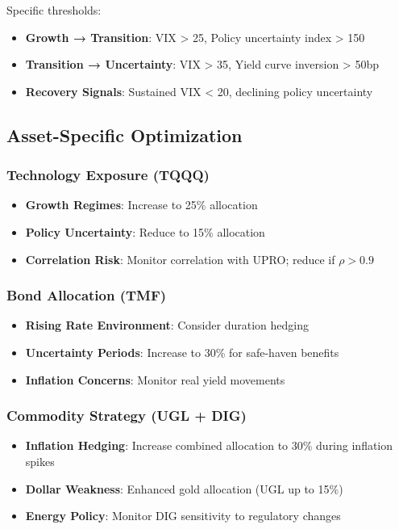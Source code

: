 \documentclass[onecolumn,ieee]{arithmaxresearch}
\begin{document}
Specific thresholds:
\begin{itemize}
    \item \textbf{Growth → Transition}: VIX > 25, Policy uncertainty index > 150
    \item \textbf{Transition → Uncertainty}: VIX > 35, Yield curve inversion > 50bp
    \item \textbf{Recovery Signals}: Sustained VIX < 20, declining policy uncertainty
\end{itemize}

\subsection{Asset-Specific Optimization}

\subsubsection{Technology Exposure (TQQQ)}
\begin{itemize}
    \item \textbf{Growth Regimes}: Increase to 25\% allocation
    \item \textbf{Policy Uncertainty}: Reduce to 15\% allocation
    \item \textbf{Correlation Risk}: Monitor correlation with UPRO; reduce if $\rho > 0.9$
\end{itemize}

\subsubsection{Bond Allocation (TMF)}
\begin{itemize}
    \item \textbf{Rising Rate Environment}: Consider duration hedging
    \item \textbf{Uncertainty Periods}: Increase to 30\% for safe-haven benefits
    \item \textbf{Inflation Concerns}: Monitor real yield movements
\end{itemize}

\subsubsection{Commodity Strategy (UGL + DIG)}
\begin{itemize}
    \item \textbf{Inflation Hedging}: Increase combined allocation to 30\% during inflation spikes
    \item \textbf{Dollar Weakness}: Enhanced gold allocation (UGL up to 15\%)
    \item \textbf{Energy Policy}: Monitor DIG sensitivity to regulatory changes
\end{itemize}
\end{document}

